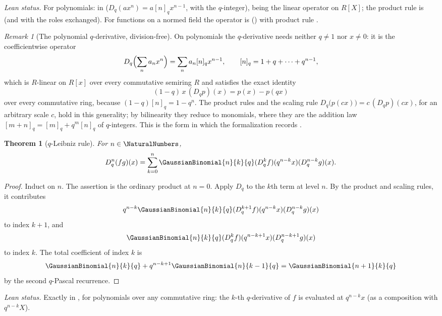 \documentclass[11pt,a4paper,oneside,openany]{book}
\newtheorem{theorem}{Theorem}[chapter]
\theoremstyle{definition}
\theoremstyle{remark}
\newtheorem{remark}[remark]{Remark}
\begin{document}
\emph{Lean status.}  For polynomials:  in
 ($D_q(ax^n)=a[n]_qx^{n-1}$, with  the
$q$-integer),  being the linear operator on $R[X]$; the product rule
is  (and  with the roles
exchanged).  For functions on a normed field the operator is 
() with product rule .


\begin{remark}[The polynomial $q$-derivative, division-free]\label{rem:qderivative-polynomial}
On polynomials the $q$-derivative needs neither $q\ne1$ nor $x\ne0$: it is the coefficientwise operator
\[
 D_q\Bigl(\sum_n a_nx^n\Bigr)=\sum_n a_n[n]_qx^{n-1},
 \qquad [n]_q=1+q+\cdots+q^{n-1},
\]
which is $R$-linear on $R[x]$ over every commutative semiring $R$ and satisfies the exact identity
\[
 (1-q)\,x\,(D_qp)(x)=p(x)-p(qx)
\]
over every commutative ring, because $(1-q)[n]_q=1-q^n$.  The product rules and the scaling rule $D_q\bigl(p(cx)\bigr)=c\,(D_qp)(cx)$, for an arbitrary scale $c$, hold in this generality; by bilinearity they reduce to monomials, where they are the addition law $[m+n]_q=[m]_q+q^m[n]_q$ of $q$-integers.  This is the form in which the formalization records .
\end{remark}

\begin{theorem}[$q$-Leibniz rule]\label{thm:q-leibniz}
For $n\in\NaturalNumbers$,
\[
 D_q^n(fg)(x)
 =\sum_{k=0}^{n}\GaussianBinomial{n}{k}{q}
 (D_q^kf)(q^{n-k}x)(D_q^{n-k}g)(x).
\]
\end{theorem}

\begin{proof}
Induct on $n$.  The assertion is the ordinary product at $n=0$.  Apply $D_q$ to the $k$th term at level $n$.  By the product and scaling rules, it contributes
\[
 q^{n-k}\GaussianBinomial{n}{k}{q}
 (D_q^{k+1}f)(q^{n-k}x)(D_q^{n-k}g)(x)
\]
to index $k+1$, and
\[
 \GaussianBinomial{n}{k}{q}(D_q^kf)(q^{n-k+1}x)(D_q^{n-k+1}g)(x)
\]
to index $k$.  The total coefficient of index $k$ is
\[
 \GaussianBinomial{n}{k}{q}+q^{n-k+1}\GaussianBinomial{n}{k-1}{q}
 =\GaussianBinomial{n+1}{k}{q}
\]
by the second $q$-Pascal recurrence.
\end{proof}

\emph{Lean status.}  Exactly  in
, for polynomials over any commutative ring: the $k$-th
$q$-derivative of $f$ is evaluated at $q^{n-k}x$ (as a composition with $q^{n-k}X$).
\end{document}
